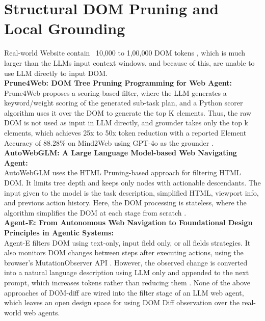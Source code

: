 \section{Structural DOM Pruning and Local Grounding}
Real-world Website contain ~10,000 to 1,00,000 DOM tokens \cite{zhang2025prune4web}, which is much larger than the LLMs input context windows, and because of this, are unable to use LLM directly to input DOM. \\
\textbf{Prune4Web: DOM Tree Pruning Programming for Web Agent:}\\
Prune4Web \cite{zhang2025prune4web} proposes a scoring-based filter, where the LLM generates a keyword/weight scoring of the generated sub-task plan, and a  Python scorer algorithm uses it over the DOM to generate the top K elements. Thus, the raw DOM is not used as input in LLM directly, and grounder takes only the top k elements, which achieves 25x to 50x token reduction with a reported Element Accuracy of 88.28\% on Mind2Web using GPT-4o as the grounder \cite{zhang2025prune4web}.\\
\textbf{AutoWebGLM: A Large Language Model-based Web Navigating Agent:}\\
AutoWebGLM \cite{lai2024autowebglm} uses the HTML Pruning-based approach for filtering HTML DOM. It limits tree depth and keeps only nodes with actionable descendants. The input given to the model is the task description, simplified HTML, viewport info, and previous action history. Here, the DOM processing is stateless, where the algorithm simplifies the DOM at each stage from scratch \cite{lai2024autowebglm}.\\
\textbf{Agent-E: From Autonomous Web Navigation to Foundational Design Principles in Agentic Systems:}\\
Agent-E \cite{tarsariya2024agente} filters DOM using text-only, input field only, or all fields strategies. It also monitors DOM changes between steps after executing actions, using the browser's MutationObserver API \cite{tarsariya2024agente}. However, the observed change is converted into a natural language description using LLM only and appended to the next prompt, which increases tokens rather than reducing them \cite{tarsariya2024agente}.
None of the above approaches of DOM-diff are wired into the filter stage of an LLM web agent, which leaves an open design space for using DOM Diff observation over the real-world web agents.

